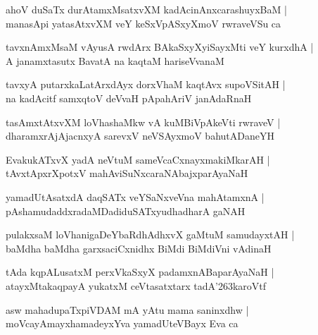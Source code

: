 \documentclass[twoside,12pt,openright]{book}
\def\S{\char'263}
\newcounter{shloka}[chapter]
\begin{document}
\begin{shloka}%
ahoV duSaTx durAtamxMsatxvXM kadAcinAnxcarashuyxBaM |\\
manasApi yatasAtxvXM veY keSxVpASxyXmoV rwraveVSu ca 
\end{shloka}

\begin{shloka}%
tavxnAmxMsaM  vAyusA rwdArx BAkaSxyXyiSayxMti veY kurxdhA |\\
A janamxtasutx BavatA na kaqtaM hariseVvanaM 
\end{shloka}

\begin{shloka}%
tavxyA putarxkaLatArxdAyx dorxVhaM kaqtAvx supoVSitAH |\\
na kadAcitf samxqtoV deVvaH pApahAriV janAdaRnaH 
\end{shloka}


\begin{shloka}%
tasAmxtAtxvXM loVhashaMkw vA kuMBiVpAkeVti rwraveV |\\
dharamxrAjAjacnxyA sarevxV neVSAyxmoV bahutADaneYH
\end{shloka}

\begin{shloka}%
EvakukATxvX yadA neVtuM sameVcaCxnayxmakiMkarAH |\\
tAvxtApxrXpotxV mahAviSuNxcaraNAbajxparAyaNaH
\end{shloka}

\begin{shloka}%
yamadUtAsatxdA daqSATx veYSaNxveVna mahAtamxnA |\\
pAshamudaddxradaMDadiduSATxyudhadharA gaNAH 
\end{shloka}

\begin{shloka}%
pulakxsaM  loVhanigaDeYbaRdhAdhxvX gaMtuM samudayxtAH |\\
baMdha baMdha garxsaciCxnidhx BiMdi BiMdiVni vAdinaH
\end{shloka}

\begin{shloka}%
tAda kqpALusatxM perxVkaSxyX padamxnABaparAyaNaH |\\
atayxMtakaqpayA yukatxM ceVtasatxtarx tadA\S karoVtf 
\end{shloka}

\begin{shloka}%
asw mahadupaTxpiVDAM mA yAtu mama saninxdhw |\\
moVcayAmayxhamadeyxYva yamadUteVBayx Eva ca
\end{shloka}
\end{document}
